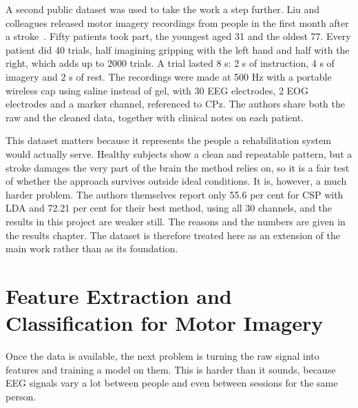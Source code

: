 A second public dataset was used to take the work a step further. Liu and colleagues
released motor imagery recordings from people in the first month after a
stroke~\cite{liu2024mi}. Fifty patients took part, the youngest aged 31 and the oldest 77.
Every patient did 40 trials, half imagining gripping with the left hand and half with the
right, which adds up to 2000 trials. A trial lasted 8 s: 2 s of instruction, 4 s of
imagery and 2 s of rest. The recordings were made at 500 Hz with a portable wireless cap
using saline instead of gel, with 30 EEG electrodes, 2 EOG electrodes and a marker
channel, referenced to CPz. The authors share both the raw and the cleaned data, together
with clinical notes on each patient.

This dataset matters because it represents the people a rehabilitation system would
actually serve. Healthy subjects show a clean and repeatable pattern, but a stroke damages
the very part of the brain the method relies on, so it is a fair test of whether the
approach survives outside ideal conditions. It is, however, a much harder problem. The
authors themselves report only 55.6 per cent for CSP with LDA and 72.21 per cent for their
best method, using all 30 channels, and the results in this project are weaker still. The
reasons and the numbers are given in the results chapter. The dataset is therefore treated
here as an extension of the main work rather than as its foundation.

\section{Feature Extraction and Classification for Motor Imagery}

Once the data is available, the next problem is turning the raw signal into features and
training a model on them. This is harder than it sounds, because EEG signals vary a lot
between people and even between sessions for the same person.

